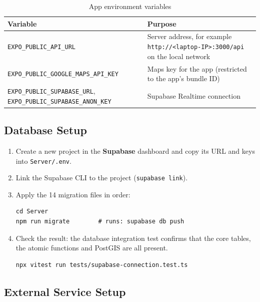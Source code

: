 \begin{table}[H]
  \centering
  \small
  \caption{App environment variables}
  \label{tab:app-env}
  \begin{tabularx}{\textwidth}{@{}p{6.4cm}L@{}}
    \toprule
    \textbf{Variable} & \textbf{Purpose} \\
    \midrule
    \texttt{EXPO\_PUBLIC\_API\_URL} & Server address, for example \texttt{http://<laptop-IP>:3000/api} on the local network \\
    \texttt{EXPO\_PUBLIC\_GOOGLE\_MAPS\_API\_KEY} & Maps key for the app (restricted to the app's bundle ID) \\
    \texttt{EXPO\_PUBLIC\_SUPABASE\_URL}, \texttt{EXPO\_PUBLIC\_SUPABASE\_ANON\_KEY} & Supabase Realtime connection \\
    \bottomrule
  \end{tabularx}
\end{table}

\subsection{Database Setup}
\label{subsec:db-setup}

\begin{enumerate}
  \item Create a new project in the \textbf{Supabase} dashboard and copy its
        URL and keys into \texttt{Server/.env}.
  \item Link the Supabase CLI to the project (\texttt{supabase link}).
  \item Apply the 14 migration files in order:
\begin{verbatim}
cd Server
npm run migrate        # runs: supabase db push
\end{verbatim}
  \item Check the result: the database integration test confirms that the core
        tables, the atomic functions and PostGIS are all present.
\begin{verbatim}
npx vitest run tests/supabase-connection.test.ts
\end{verbatim}
\end{enumerate}

\subsection{External Service Setup}
\label{subsec:external-setup}

